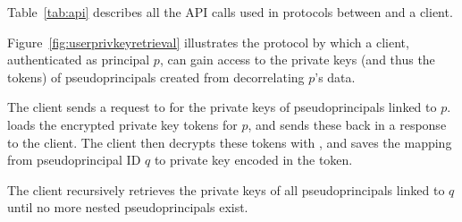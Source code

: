 Table~\ref{tab:api} describes all the API calls used in protocols between \sys and a client.

Figure~\ref{fig:userprivkeyretrieval} illustrates the protocol by which a client, authenticated as
principal $p$, can gain access to the private keys (and thus the tokens) of pseudoprincipals created
from decorrelating $p$'s data.

The client sends a request to \sys for the private keys of pseudoprincipals linked to $p$. \sys
loads the encrypted private key tokens for $p$, and sends these back in a response to the client.
%
The client then decrypts these tokens with , and saves the mapping from pseudoprincipal ID
$q$ to private key  encoded in the token.

The client recursively retrieves the private keys of all pseudoprincipals linked to $q$ until
no more nested pseudoprincipals exist.

\begin{figure*}[t!]
\caption{\textbf{PseudoPrincipal Key Retrieval.}}
\label{fig:userprivkeyretrieval}
\end{figure*}

